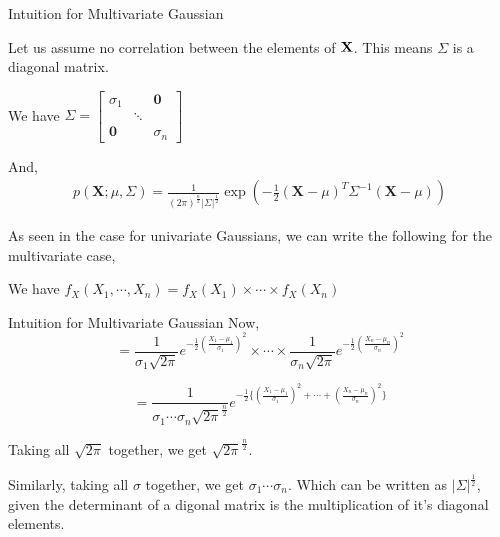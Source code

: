 \documentclass{beamer}
\begin{document}
\begin{frame}{Intuition for Multivariate Gaussian}
	
	Let us assume no correlation between the elements of $\bf{X}$. This means $\Sigma$ is a diagonal matrix.
	
	We have $\Sigma = \begin{bmatrix} 
	\sigma_{1} & & \textbf{0}\\
	 & \ddots &\\
	\textbf{0} &  & \sigma_n 
	\end{bmatrix}
	$ 
	
	And,
	\begin{gather}
		p(\mathbf{X} ; \mu, \Sigma)=\frac{1}{(2 \pi)^{\frac{n}{2}}|\Sigma|^{\frac{1}{2}}} \exp \left(-\frac{1}{2}(\mathbf{X}-\mu)^{T} \Sigma^{-1}(\mathbf{X}-\mu)\right)
	\end{gather}
	
	As seen in the case for univariate Gaussians, we can write the following for the multivariate case,
	
	We have $f_X(X_1, \cdots, X_n) = f_X(X_1)\times \cdots \times f_X(X_n)$
\end{frame}

\begin{frame}{Intuition for Multivariate Gaussian}
	Now,
	$$=\frac{1}{\sigma_1 \sqrt{2\pi} } e^{-\frac{1}{2}\left(\frac{X_1-\mu_1}{\sigma_1}\right)^2} \times \cdots \times \frac{1}{\sigma_n \sqrt{2\pi} } e^{-\frac{1}{2}\left(\frac{X_n-\mu_n}{\sigma_n}\right)^2}$$
	
	$$= \frac{1}{\sigma_1 \cdots \sigma_n \sqrt{2\pi}^{\frac{n}{2}} } e^{-\frac{1}{2}\{\left(\frac{X_1-\mu_1}{\sigma_1}\right)^2 + \cdots + \left(\frac{X_n-\mu_n}{\sigma_n}\right)^2 \}}  $$
	
	Taking all $\sqrt{2\pi}$ together, we get $\sqrt{2\pi}^{\frac{n}{2}}$.
	
	Similarly, taking all $\sigma$ together, we get $\sigma_1 \cdots \sigma_n$. Which can be written as $\vert\Sigma\vert^{\frac{1}{2}}$, given the determinant of a digonal matrix is the multiplication of it's diagonal elements.
\end{frame}
\end{document}
